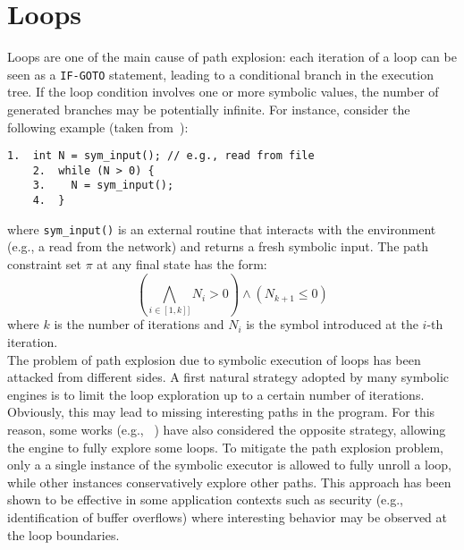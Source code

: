 
\section{Loops}
\label{se:loops}

Loops are one of the main cause of path explosion: each iteration of a loop can be seen as a {\tt IF-GOTO} statement, leading to a conditional branch in the execution tree. If the loop condition involves one or more symbolic values, the number of generated branches may be potentially infinite. For instance, consider the following example (taken from~\cite{CS-CACM13}):
    \begin{lstlisting}[basicstyle=\ttfamily\small]
    1.  int N = sym_input(); // e.g., read from file
    2.  while (N > 0) {
    3.    N = sym_input();  
    4.  }
    \end{lstlisting}
where \texttt{sym\_input()} is an external routine that interacts with the environment (e.g., a read from the network) and returns a fresh symbolic input. The path constraint set $\pi$ at any final state has the form:
  \[ \left ( \bigwedge_{i \in [1, k]]} N_i > 0 \right ) \wedge (N_{k+1} \leq 0) \]
where  $k$ is the number of iterations and $N_i$ is the symbol introduced at the $i$-th iteration.\\

The problem of path explosion due to symbolic execution of loops has been attacked from different sides. A first natural strategy adopted by many symbolic engines is to limit the loop exploration up to a certain number of iterations. Obviously, this may lead to missing interesting paths in the program. For this reason, some works (e.g., ~\cite{AEG-NDSS11}) have also considered the opposite strategy, allowing the engine to fully explore some loops. To mitigate the path explosion problem, only a a single instance of the symbolic executor is allowed to fully unroll a loop, while other instances conservatively explore other paths. This approach has been shown to be effective in some application contexts such as security (e.g., identification of buffer overflows) where interesting behavior may be observed at the loop boundaries.


